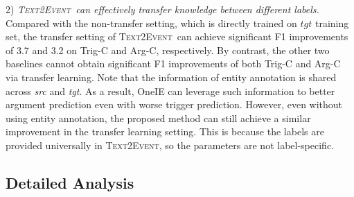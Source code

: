 \documentclass[11pt,a4paper]{article}
\newcommand\modelname{\textsc{Text2Event}}
\begin{document}
2) \textit{\modelname\, can effectively transfer knowledge between different labels.}
Compared with the non-transfer setting, which is directly trained on $tgt$ training set, the transfer setting of \modelname\, can achieve significant F1 improvements of 3.7 and 3.2 on Trig-C and Arg-C, respectively.
By contrast, the other two baselines cannot obtain significant F1 improvements of both Trig-C and Arg-C via transfer learning.
Note that the information of entity annotation is shared across \textit{src} and \textit{tgt}.
As a result, OneIE can leverage such information to better argument prediction even with worse trigger prediction.
However, even without using entity annotation, the proposed method can still achieve a similar improvement in the transfer learning setting.
This is because the labels are provided universally in \modelname, so the parameters are not label-specific.

\subsection{Detailed Analysis}
\end{document}
